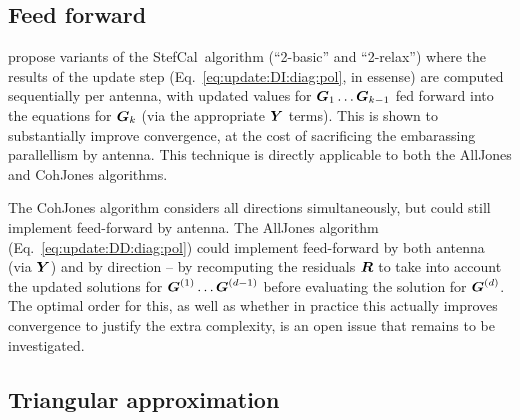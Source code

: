 \documentclass[useAMS,usenatbib]{mn2e}
\newcommand{\mat}[1]{{\bmath{#1}}}
\newcommand{\RR}{\mat{R}}
\newcommand{\GG}{\mat{G}}
\newcommand{\StefCal}{{\sc StefCal}}
\numberwithin{equation}{section}
\begin{document}
\subsection{Feed forward}
\label{sec:feed-forward}

\citet{Stefcal-URSI} propose variants of the \StefCal\ algorithm (``2-basic'' and ``2-relax'') where the results of the 
update step (Eq.~\ref{eq:update:DI:diag:pol}, in essense) are computed sequentially per antenna, with updated
values for $\GG_1\dots\GG_{k-1}$ fed forward into the equations for $\GG_k$ (via the appropriate $\YY$ terms). This is shown to 
substantially improve convergence, at the cost of sacrificing the embarassing parallellism by antenna. This technique 
is directly applicable to both the {\sc AllJones} and {\sc CohJones} algorithms. 

The {\sc CohJones} algorithm considers all directions simultaneously, but could still implement feed-forward by antenna.
The {\sc AllJones} algorithm (Eq.~\ref{eq:update:DD:diag:pol}) could implement feed-forward by both antenna (via $\YY$) and 
by direction -- by recomputing the residuals $\RR$ to take into account the updated solutions for $\GG^{(1)}\dots\GG^{(d-1)}$ before
evaluating the solution for $\GG^{(d)}$.  The optimal order for this, as well as whether in practice this actually 
improves convergence to justify the extra complexity, is an open issue that remains to be investigated.

\subsection{Triangular approximation}
\end{document}
